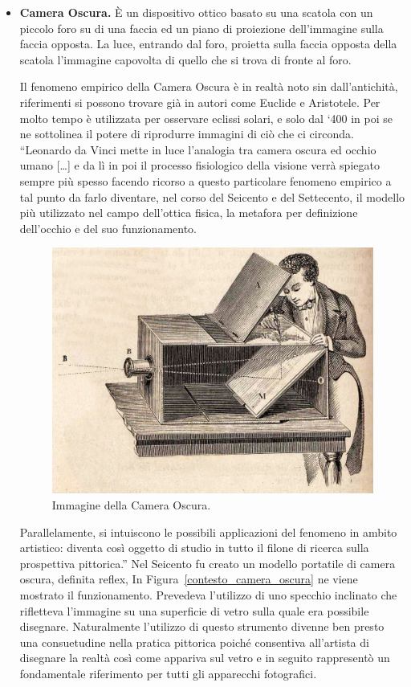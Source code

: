 \begin{itemize}
	\item \textbf{Camera Oscura.}
	\label{contesto_camera_oscura}
	È un dispositivo ottico basato su una scatola con un piccolo foro su di una faccia ed un piano di proiezione dell’immagine sulla faccia opposta. La luce, entrando dal foro, proietta sulla faccia opposta della scatola l’immagine capovolta di quello che si trova di fronte al foro.
	
	Il fenomeno empirico della Camera Oscura è in realtà noto sin dall’antichità, riferimenti si possono trovare già in autori come Euclide e Aristotele.
	Per molto tempo è utilizzata per osservare eclissi solari, e solo dal ‘400 in poi se ne sottolinea il potere di riprodurre immagini di ciò che ci circonda. “Leonardo da Vinci mette in luce l’analogia tra camera oscura ed occhio umano […] e da lì in poi il processo fisiologico della visione verrà spiegato sempre più spesso facendo ricorso a questo particolare fenomeno empirico a tal punto da farlo diventare, nel corso del Seicento e del Settecento, il modello più utilizzato nel campo dell’ottica fisica, la metafora per definizione dell’occhio e del suo funzionamento.
	
	\begin{figure}%
		\centering
		\includegraphics[width= 0.7\columnwidth]{images/contestoRiferimento/01_cameraOscura.jpg}
		\caption{Immagine della Camera Oscura.}
		\label{fig:contesto_riferimento_camera_oscura}
	\end{figure}
	
	Parallelamente, si intuiscono le possibili applicazioni del fenomeno in ambito artistico: diventa così oggetto di studio in tutto il filone di ricerca sulla prospettiva pittorica.”
	Nel Seicento fu creato un modello portatile di camera oscura, definita reflex, In Figura~\ref{contesto_camera_oscura} ne viene mostrato il funzionamento. Prevedeva l’utilizzo di uno specchio inclinato che rifletteva l’immagine su una superficie di vetro sulla quale era possibile disegnare. Naturalmente l’utilizzo di questo strumento divenne ben presto una consuetudine nella pratica pittorica poiché consentiva all’artista di disegnare la realtà così come appariva sul vetro e in seguito rappresentò un fondamentale riferimento per tutti gli apparecchi fotografici.
	

\end{itemize}
